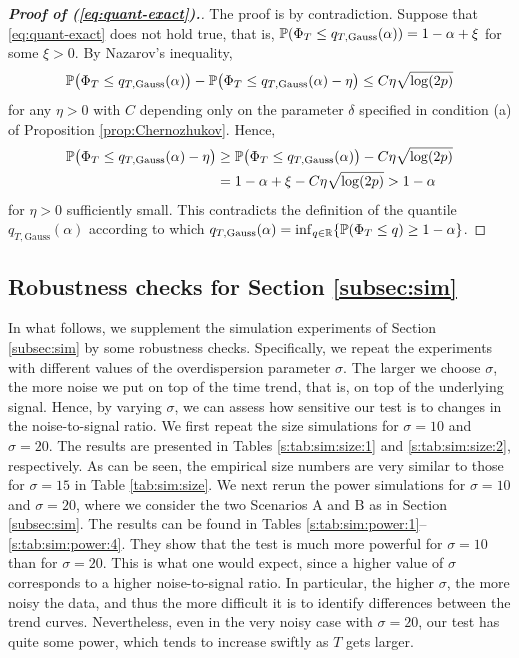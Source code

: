 \documentclass[a4paper,12pt]{article}
\numberwithin{equation}{section}
\begin{document}
\begin{proof}[\textnormal{\textbf{Proof of (\ref{eq:quant-exact}).}}]
The proof is by contradiction. Suppose that \eqref{eq:quant-exact} does not hold true, that is, $\mathbb{P}(\Phi_T \le q_{T,\text{Gauss}}(\alpha)) = 1-\alpha + \xi$ for some $\xi > 0$. By Nazarov's inequality, 
\begin{equation*}
\mathbb{P} \big(\Phi_T \le q_{T,\text{Gauss}}(\alpha)\big) - \mathbb{P}\big(\Phi_T \le q_{T,\text{Gauss}}(\alpha) - \eta\big) \le C \eta \sqrt{\log (2p)} 
\end{equation*}
for any $\eta > 0$ with $C$ depending only on the parameter $\delta$ specified in condition (a) of Proposition \ref{prop:Chernozhukov}. Hence, 
\begin{align*}
\mathbb{P} \big(\Phi_T \le q_{T,\text{Gauss}}(\alpha) - \eta\big) 
 & \ge \mathbb{P}\big(\Phi_T \le q_{T,\text{Gauss}}(\alpha) \big) - C \eta \sqrt{\log(2p)} \\
 & = 1-\alpha + \xi - C \eta \sqrt{\log(2p)} > 1-\alpha
\end{align*}
for $\eta > 0$ sufficiently small. This contradicts the definition of the quantile $q_{T,\text{Gauss}}(\alpha)$ according to which $q_{T,\text{Gauss}}(\alpha) = \inf_{q \in \mathbb{R}} \{ \mathbb{P}(\Phi_T \le q) \ge 1-\alpha \}$. 
\end{proof}

\newpage
\subsection{Robustness checks for Section \ref{subsec:sim}}\label{s:subsec:robustness}


In what follows, we supplement the simulation experiments of Section \ref{subsec:sim} by some robustness checks. Specifically, we repeat the experiments with different values of the overdispersion parameter $\sigma$. The larger we choose $\sigma$, the more noise we put on top of the time trend, that is, on top of the underlying signal. Hence, by varying $\sigma$, we can assess how sensitive our test is to changes in the noise-to-signal ratio. We first repeat the size simulations for $\sigma = 10$ and $\sigma = 20$. The results are presented in Tables \ref{s:tab:sim:size:1} and \ref{s:tab:sim:size:2}, respectively. As can be seen, the empirical size numbers are very similar to those for $\sigma=15$ in Table \ref{tab:sim:size}. We next rerun the power simulations for $\sigma = 10$ and $\sigma = 20$, where we consider the two Scenarios A and B as in Section \ref{subsec:sim}. The results can be found in Tables \ref{s:tab:sim:power:1}--\ref{s:tab:sim:power:4}. They show that the test is much more powerful for $\sigma=10$ than for $\sigma=20$. This is what one would expect, since a higher value of $\sigma$ corresponds to a higher noise-to-signal ratio. In particular, the higher $\sigma$, the more noisy the data, and thus the more difficult it is to identify differences between the trend curves. Nevertheless, even in the very noisy case with $\sigma = 20$, our test has quite some power, which tends to increase swiftly as $T$ gets larger. 
\vspace{0.4cm}
\end{document}
